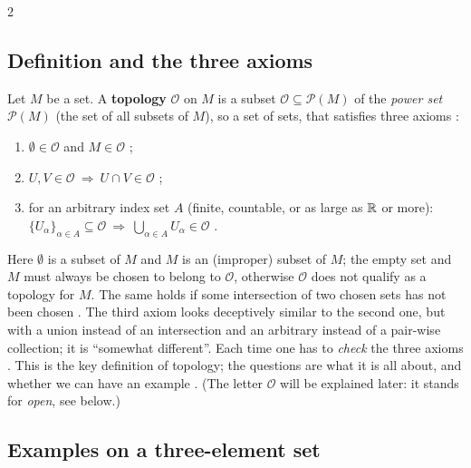 \begin{paracol}{2}
\subsection{Definition and the three axioms}

\begin{definition}\label{def:c01-topology}
Let $M$ be a set. A \textbf{topology} $\mathcal O$ on $M$ is a subset $\mathcal O\subseteq\mathcal P(M)$ of the \emph{power set}
$\mathcal P(M)$ (the set of all subsets of $M$), so a set of sets, that satisfies three axioms
:
\begin{enumerate}
  \item $\emptyset\in\mathcal O$ and $M\in\mathcal O$ ;
  \item $U,V\in\mathcal O\ \Rightarrow\ U\cap V\in\mathcal O$ ;
  \item for an arbitrary index set $A$ (finite, countable, or as large as $\mathbb{R}$ or more):
        $\{U_\alpha\}_{\alpha\in A}\subseteq\mathcal O\ \Rightarrow\ \bigcup_{\alpha\in A}U_\alpha\in\mathcal O$
        .
\end{enumerate}
\end{definition}
Here $\emptyset$ is a subset of $M$ and $M$ is an (improper) subset of $M$; the empty set and $M$ must always be chosen to belong to
$\mathcal O$, otherwise $\mathcal O$ does not qualify as a topology for $M$. The same holds if some intersection of two chosen
sets has not been chosen . The third axiom looks deceptively similar to the
second one, but with a union instead of an intersection and an arbitrary instead of a pair-wise collection; it is
``somewhat different''. Each time one has to \emph{check} the three axioms .
This is the key definition of topology; the questions are what it is all about, and whether we can have an example
. (The letter $\mathcal O$ will be explained later: it stands for \emph{open}, see below.)

\subsection{Examples on a three-element set}


\end{paracol}
